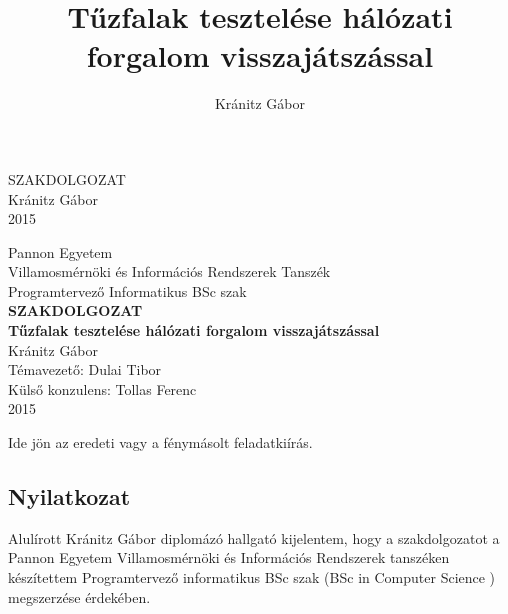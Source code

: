 \documentclass[a4paper,12pt,oneside]{report}
\title{Tűzfalak tesztelése hálózati forgalom visszajátszással}
\author{Kránitz Gábor}
\date{}
\begin{document}

\setcounter{chapter}{1}

\pagestyle{empty}
{
    \begin{center}
    \vspace*{5cm}
    {
        \Huge SZAKDOLGOZAT}\\
        \vspace*{10cm}
        {\LARGE Kránitz Gábor}\\
        \vspace*{3cm}
        {\LARGE 2015}
    \end{center}
}
\newpage

\begin{center}
{
    \Large Pannon Egyetem\\
    Villamosmérnöki és Információs Rendszerek Tanszék\vspace*{3mm}\\
    Programtervező Informatikus BSc szak
}
    \vspace*{2cm}\\
    {\LARGE \bf SZAKDOLGOZAT}
    \vspace{3cm}\\
    {\LARGE\bf Tűzfalak tesztelése hálózati forgalom visszajátszással }
    \vspace{3cm}\\
    {\large Kránitz Gábor}
    \vspace{6cm}
    \\
    {\large Témavezető: Dulai Tibor}\\
    {\large Külső konzulens: Tollas Ferenc}
    \vspace{1cm}\\
    {\large 2015}
\end{center}
\normalsize
\newpage

Ide jön az eredeti vagy a fénymásolt feladatkiírás.
\newpage

\begin{center}
\section*{Nyilatkozat}
\end{center}

Alulírott Kránitz Gábor diplomázó hallgató kijelentem, hogy a szakdolgozatot a Pannon Egyetem Villamosmérnöki és Információs Rendszerek tanszéken készítettem Programtervező informatikus BSc szak (BSc in Computer Science
) megszerzése érdekében.
\end{document}
